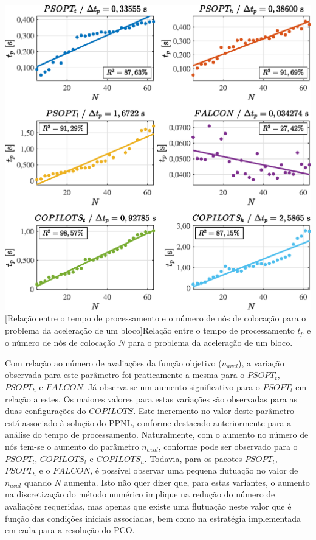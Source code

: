 \noindent
\begin{minipage}{\textwidth}
	\vspace{\onelineskip}
	\centering
	\includegraphics[scale=0.7]{fig/resultados/integrador/sens/t}
	[Relação entre o tempo de processamento e o número de nós de colocação para o problema da aceleração de um bloco]{Relação entre o tempo de processamento $ t_p $ e o número de nós de colocação $ N $ para o problema da aceleração de um bloco.}
	\label{fig:integrador:sensibilidade:t}
	\vspace{\onelineskip}
\end{minipage}

Com relação ao número de avaliações da função objetivo ($ n_{aval} $), a variação observada para este parâmetro foi praticamente a mesma para o $ PSOPT_t$, $ PSOPT_h$ e $FALCON$. Já observa-se um aumento significativo para o $ PSOPT_l$ em relação a estes. Os maiores valores para estas variações são observadas para as duas configurações do $COPILOTS$. Este incremento no valor deste parâmetro está associado à solução do PPNL, conforme destacado anteriormente para a análise do  tempo de processamento. Naturalmente, com o aumento no número de nós tem-se o aumento do parâmetro $n_{aval}$, conforme pode ser observado para o $ PSOPT_l$, $COPILOTS_t$ e $COPILOTS_h$. Todavia, para os pacotes $ PSOPT_t$, $ PSOPT_h$ e o $FALCON$, é possível observar uma pequena flutuação no valor de $ n_{aval} $ quando $N$ aumenta. Isto não quer dizer que, para estas variantes, o aumento na discretização do método numérico implique na redução do número de avaliações requeridas, mas apenas que existe uma flutuação neste valor que é função das condições iniciais associadas, bem como na estratégia implementada em cada para a resolução do PCO.

